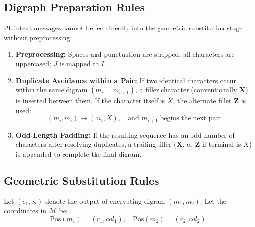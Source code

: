\documentclass[12pt,a4paper]{article}
\begin{document}
\subsection{Digraph Preparation Rules}
Plaintext messages cannot be fed directly into the geometric substitution stage without preprocessing:
\begin{enumerate}
    \item \textbf{Preprocessing:} Spaces and punctuation are stripped; all characters are uppercased; $J$ is mapped to $I$.
    \item \textbf{Duplicate Avoidance within a Pair:} If two identical characters occur within the same digram $(m_i = m_{i+1})$, a filler character (conventionally \textbf{X}) is inserted between them. If the character itself is $X$, the alternate filler \textbf{Z} is used:
    \begin{equation}
        (m_i, m_i) \longrightarrow (m_i, X), \quad \text{and } m_{i+1} \text{ begins the next pair}
    \end{equation}
    \item \textbf{Odd-Length Padding:} If the resulting sequence has an odd number of characters after resolving duplicates, a trailing filler (\textbf{X}, or \textbf{Z} if terminal is $X$) is appended to complete the final digram.
\end{enumerate}

\subsection{Geometric Substitution Rules}
Let $(c_1, c_2)$ denote the output of encrypting digram $(m_1, m_2)$. Let the coordinates in $\mathcal{M}$ be:
\begin{equation}
    \text{Pos}(m_1) = (r_1, col_1), \quad \text{Pos}(m_2) = (r_2, col_2)
\end{equation}
\end{document}
